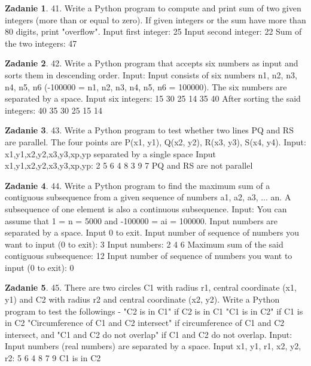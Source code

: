 \documentclass[11pt]{article}
\theoremstyle{definition}
\newtheorem{zadanie}{Zadanie}
\begin{document}
\begin{zadanie}
41. Write a Python program to compute and print sum of two given integers (more than or equal to zero). If given integers or the sum have more than 80 digits, print "overflow".
Input first integer:
25
Input second integer:
22
Sum of the two integers: 47
\end{zadanie}

\begin{zadanie}
42. Write a Python program that accepts six numbers as input and sorts them in descending order.
Input:
Input consists of six numbers n1, n2, n3, n4, n5, n6 (-100000 = n1, n2, n3, n4, n5, n6 = 100000). The six numbers are separated by a space.
Input six integers:
15 30 25 14 35 40
After sorting the said integers:
40 35 30 25 15 14
\end{zadanie}

\begin{zadanie}
43. Write a Python program to test whether two lines PQ and RS are parallel. The four points are P(x1, y1), Q(x2, y2), R(x3, y3), S(x4, y4).
Input:
x1,y1,x2,y2,x3,y3,xp,yp separated by a single space
Input x1,y1,x2,y2,x3,y3,xp,yp:
2 5 6 4 8 3 9 7
PQ and RS are not parallel
\end{zadanie}

\begin{zadanie}
44. Write a Python program to find the maximum sum of a contiguous subsequence from a given sequence of numbers a1, a2, a3, ... an. A subsequence of one element is also a continuous subsequence.
Input:
You can assume that 1 = n = 5000 and -100000 = ai = 100000.
Input numbers are separated by a space.
Input 0 to exit.
Input number of sequence of numbers you want to input (0 to exit):
3
Input numbers:
2
4
6
Maximum sum of the said contiguous subsequence:
12 Input number of sequence of numbers you want to input (0 to exit):
0
\end{zadanie}

\begin{zadanie}
45. There are two circles C1 with radius r1, central coordinate (x1, y1) and C2 with radius r2 and central coordinate (x2, y2).
Write a Python program to test the followings -
"C2 is in C1" if C2 is in C1
"C1 is in C2" if C1 is in C2
"Circumference of C1 and C2 intersect" if circumference of C1 and C2 intersect, and
"C1 and C2 do not overlap" if C1 and C2 do not overlap.
Input:
Input numbers (real numbers) are separated by a space.
Input x1, y1, r1, x2, y2, r2:
5 6 4 8 7 9
C1 is in C2
\end{zadanie}
\end{document}
